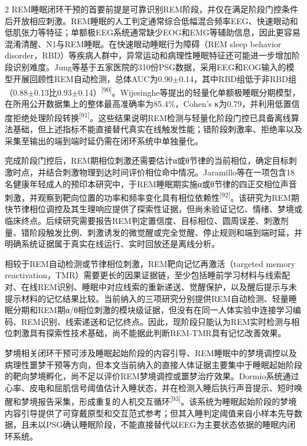 \documentclass[UTF8,zihao=5,fontset=none]{ctexart}
\newcommand{\hei}{\CJKfamily{hei}}
\newcommand{\leveltwo}[1]{%
  \par\noindent{\hei\fontsize{10.5pt}{15.6pt}\selectfont\bfseries #1\par}}
\newcommand{\refcite}[1]{\nolinebreak[4]\textsuperscript{[#1]}}
\begin{document}
\begin{multicols}{2}
REM睡眠闭环干预的首要前提是可靠识别REM阶段，并仅在满足阶段门控条件后开放相应刺激。REM睡眠的人工判定通常综合低幅混合频率EEG、快速眼动和低肌张力等特征；单额极EEG系统通常缺少EOG和EMG等辅助信息，因此更容易混淆清醒、N1与REM睡眠。在快速眼动睡眠行为障碍（REM sleep behavior disorder，RBD）等疾病人群中，异常运动和病理性睡眠特征还可能进一步增加阶段识别难度。Jung等基于五家医院的310份PSG数据，采用EEG和EOG输入的模型开展回顾性REM自动检测，总体AUC为0.90$\pm$0.14，其中RBD组低于非RBD组（0.88$\pm$0.13比0.93$\pm$0.14）\refcite{90}。Wijesinghe等提出的轻量化单额极睡眠分期模型，在所用公开数据集上的整体最高准确率为85.4\%，Cohen's κ为0.79，并利用低置信度拒绝处理阶段转换\refcite{91}。这些结果说明REM检测与轻量化阶段门控已具备离线算法基础，但上述指标不能直接替代真实在线触发性能；错阶段刺激率、拒绝率以及采集至输出的端到端时延仍需在闭环系统中单独量化。\par

完成阶段门控后，REM期相位刺激还需要估计α或θ节律的当前相位，确定目标刺激时点，并结合刺激物理到达时间评价相位命中情况。Jaramillo等在一项包含18名健康年轻成人的预印本研究中，于REM睡眠期实施α或θ节律的四正交相位声音刺激，并观察到靶向位置的功率和频率变化具有相位依赖性\refcite{92}。该研究为REM期快节律相位调控及其生理响应提供了探索性证据，但尚未验证记忆、情绪、梦境或临床终点。后续研究需要报告REM判定置信度、目标相位、圆周误差、刺激剂量、错阶段触发比例、刺激诱发的微觉醒或完全觉醒、停止规则和端到端时延，并明确系统证据属于真实在线运行、实时回放还是离线分析。\par

相较于REM自动检测或节律相位刺激，REM靶向记忆再激活（targeted memory reactivation，TMR）需要更长的因果证据链，至少包括睡前学习材料与线索配对、在线REM识别、睡眠中对应线索的重新递送、觉醒保护，以及醒后提示与未提示材料的记忆结果比较。当前纳入的三项研究分别提供REM自动检测、轻量睡眠分期和REM期α/θ相位刺激的模块级证据，但没有在同一人体实验中连接学习编码、REM识别、线索递送和记忆终点。因此，现阶段只能认为REM实时检测与相位刺激具有探索性技术基础，尚不能据此判断REM-TMR具有记忆改善效果。\par

\leveltwo{4.4 梦境调控}

梦境相关闭环干预可涉及睡眠起始阶段的内容引导、REM睡眠中的梦境调控以及病理性噩梦干预等方向，但本文当前纳入的直接人体证据主要集中于睡眠起始阶段的靶向梦境孵化，尚不足以评价REM梦境调控或噩梦治疗效果。Dormio系统通过心率、皮电和屈肌信号阈值估计入睡状态，并在检测入睡后执行声音提示、短时唤醒和梦境报告采集，形成重复的人机交互循环\refcite{93}。该系统为睡眠起始阶段的梦境内容引导提供了可穿戴原型和交互范式参考；但其入睡判定阈值来自小样本先导数据，且未以PSG确认睡眠阶段，不能直接替代以EEG为主要状态依据的睡眠内闭环系统。\par


\end{multicols}
\end{document}
